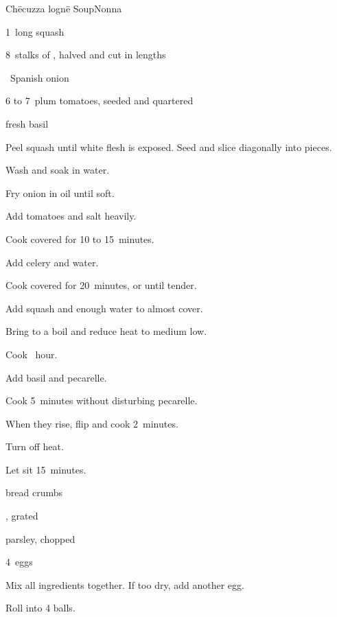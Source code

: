 \begin{recipe}{Ch\"ecuzza logn\"e Soup}{Nonna}{}

\begin{ingredients}
\item 1~long squash
\item 8~stalks of , halved and cut in  lengths
\item \half~Spanish onion
\item 6 to 7~plum tomatoes, seeded and quartered
\item fresh basil
\end{ingredients}

\begin{directions}
\item Peel squash until white flesh is exposed. Seed and slice diagonally into \inch{\threequarter} pieces.
\item Wash and soak in water.
\item Fry onion in oil until soft.
\item Add tomatoes and salt heavily.
\item Cook covered for 10 to 15~minutes.
\item Add celery and  water.
\item Cook covered for 20~minutes, or until tender.
\item Add squash and enough water to almost cover.
\item Bring to a boil and reduce heat to medium low.
\item Cook \half~hour.
\item Add basil and pecarelle.
\item Cook 5~minutes without disturbing pecarelle.
\item When they rise, flip and cook 2~minutes.
\item Turn off heat.
\item Let sit 15~minutes.
\end{directions}

\begin{ingredients}
\item \C{\threequarter} bread crumbs
\item {} , grated
\item parsley, chopped
\item 4~eggs
\end{ingredients}

\begin{directions}
\item Mix all ingredients together. If too dry, add another egg.
\item Roll into 4 balls.
\end{directions}

\end{recipe}
